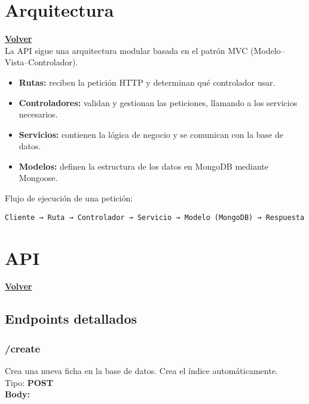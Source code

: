 \documentclass[a4paper,12pt]{article}
\begin{document}
\clearpage

\section{Arquitectura}
\hyperlink{anchor-indice}{\textbf{Volver}}\\

La API sigue una arquitectura modular basada en el patrón MVC (Modelo–Vista–Controlador).

\begin{itemize}
    \item \textbf{Rutas:} reciben la petición HTTP y determinan qué controlador usar.
    \item \textbf{Controladores:} validan y gestionan las peticiones, llamando a los servicios necesarios.
    \item \textbf{Servicios:} contienen la lógica de negocio y se comunican con la base de datos.
    \item \textbf{Modelos:} definen la estructura de los datos en MongoDB mediante Mongoose.
\end{itemize}

Flujo de ejecución de una petición:
\begin{verbatim}
Cliente → Ruta → Controlador → Servicio → Modelo (MongoDB) → Respuesta
\end{verbatim}

\clearpage

\section{API}
\hyperlink{anchor-indice}{\textbf{Volver}}\\

\subsection{Endpoints detallados}

\subsubsection{/create}
Crea una nueva ficha en la base de datos. Crea el índice automáticamente.\\

Tipo: \textbf{POST}\\[0.5em]

\textbf{Body:}\\
\end{document}
